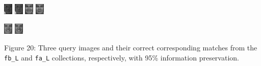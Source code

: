\documentclass[ 12pt ]{article}
\begin{document}
\begin{enumerate}
\begin{enumerate}
                \begin{center}
                    \includegraphics[scale=5]{f_l_images/AnyConv.com__00182_940422_fb_a}
                    \includegraphics[scale=5]{f_l_images/AnyConv.com__00182_940422_fa_a}
                    \includegraphics[scale=5]{f_l_images/AnyConv.com__00753_941201_fb}
                    \includegraphics[scale=5]{f_l_images/AnyConv.com__00753_941201_fa}
                \end{center}
                \begin{center}
                    \includegraphics[scale=5]{f_l_images/AnyConv.com__00501_940519_fb}
                    \includegraphics[scale=5]{f_l_images/AnyConv.com__00501_940519_fa}
                \end{center}
                \begin{center}
                    \scriptsize
                    Figure 20: Three query images and their correct corresponding matches from the \verb|fb_L| and \verb|fa_L| collections, respectively, with 95\%
                    information preservation.
                \end{center}
                \newpage


\end{enumerate}
\end{enumerate}
\end{document}

